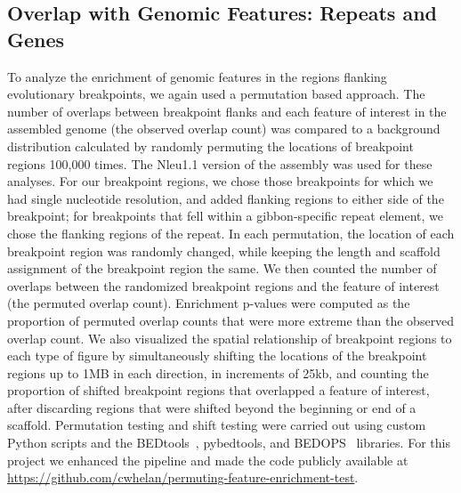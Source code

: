 \subsection{Overlap with Genomic Features: Repeats and Genes}

To analyze the enrichment of genomic features in the regions flanking evolutionary breakpoints, we again used a permutation based approach. The number of overlaps between breakpoint flanks and each feature of interest in the assembled genome (the observed overlap count) was compared to a background distribution calculated by randomly permuting the locations of breakpoint regions 100,000 times. The Nleu1.1 version of the assembly was used for these analyses. For our breakpoint regions, we chose those breakpoints for which we had single nucleotide resolution, and added flanking regions to either side of the breakpoint; for breakpoints that fell within a gibbon-specific repeat element, we chose the flanking regions of the repeat. In each permutation, the location of each breakpoint region was randomly changed, while keeping the length and scaffold assignment of the breakpoint region the same. We then counted the number of overlaps between the randomized breakpoint regions and the feature of interest (the permuted overlap count). Enrichment p-values were computed as the proportion of permuted overlap counts that were more extreme than the observed overlap count. We also visualized the spatial relationship of breakpoint regions to each type of figure by simultaneously shifting the locations of the breakpoint regions up to 1MB in each direction, in increments of 25kb, and counting the proportion of shifted breakpoint regions that overlapped a feature of interest, after discarding regions that were shifted beyond the beginning or end of a scaffold. Permutation testing and shift testing were carried out using custom Python scripts and the BEDtools~\cite{Quinlan:2010km}, pybedtools\cite{Dale:2011cl}, and BEDOPS~\cite{Neph:2012kq} libraries. For this project we enhanced the pipeline and made the code publicly available at \url{https://github.com/cwhelan/permuting-feature-enrichment-test}.

